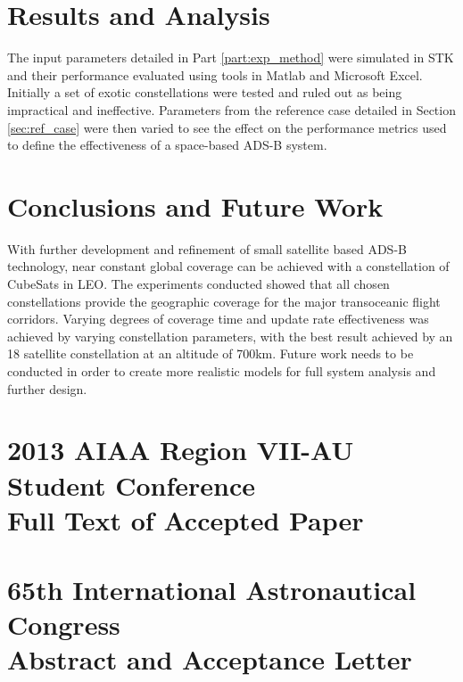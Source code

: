 \documentclass[12pt, a4paper, subeqn]{report}
\numberwithin{figure}{chapter}
\numberwithin{table}{chapter}
\numberwithin{equation}{chapter}
\begin{document}
\chapter{Results and Analysis}\label{part:results}
The input parameters detailed in Part \ref{part:exp_method} were simulated in STK and their performance evaluated using tools in Matlab and Microsoft Excel. Initially a set of exotic constellations were tested and ruled out as being impractical and ineffective. Parameters from the reference case detailed in Section \ref{sec:ref_case} were then varied to see the effect on the performance metrics used to define the effectiveness of a space-based ADS-B system. 







\chapter{Conclusions and Future Work}\label{part:concl}
With further development and refinement of small satellite based ADS-B technology, near constant global coverage can be achieved with a constellation of CubeSats in LEO. The experiments conducted showed that all chosen constellations provide the geographic coverage for the major transoceanic flight corridors. Varying degrees of coverage time and update rate effectiveness was achieved by varying constellation parameters, with the best result achieved by an 18 satellite constellation at an altitude of 700km. Future work needs to be conducted in order to create more realistic models for full system analysis and further design.



%
\newpage
{}



\newpage
{}
\appendix

\chapter{2013 AIAA Region VII-AU Student Conference \\ Full Text of Accepted Paper}
\label{app:aiiastuconf}

\chapter{65th International Astronautical Congress \\ Abstract and Acceptance Letter}
\label{app:iac_2014}







\end{document}
